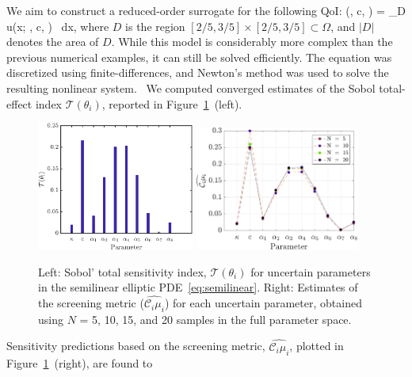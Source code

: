 We aim to construct a reduced-order surrogate for the following QoI:
\be
{}(\kappa, c, \theta) =  \int_D u(x; \kappa, c, \theta) \, dx, 
\label{eq:qoi}
\ee
%
where $D$ is the region $[2/5, 3/5] \times [2/5, 3/5] \subset \Omega$, 
and $|D|$ denotes the area of $D$. 
While this model is considerably more complex than the previous numerical
examples, it can still be solved efficiently.
The equation was discretized using finite-differences, and Newton's method
was used to solve the resulting nonlinear system.~ 
We computed converged estimates of the Sobol
total-effect index $\mathcal{T}(\theta_i)$, reported 
in Figure~\ref{fig:sense_elliptic}~(left).~
\begin{figure}[htbp]
 \begin{center}
  \includegraphics[width=0.46\textwidth]{./Figures/sense_elliptic}
  \includegraphics[width=0.48\textwidth]{./Figures/ub_conv_elliptic}
\caption{
Left: Sobol' total sensitivity index, $\mathcal{T}(\theta_i)$ for uncertain parameters in the 
semilinear elliptic PDE~\eqref{eq:semilinear}. Right: 
Estimates of the screening metric ($\widehat{\mathcal{C}_i\mu_i}$) for each uncertain parameter,
obtained using $N$ = 5, 10, 15, and 20 samples in the full parameter space.}
\label{fig:sense_elliptic}
\end{center}
\end{figure}
%
Sensitivity predictions based on the screening metric, $\widehat{\mathcal{C}_i\mu_i}$,
plotted in Figure~\ref{fig:sense_elliptic}~(right), are found to
